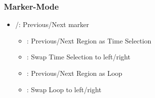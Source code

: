 \subsubsection{Marker-Mode}
\begin{itemize}
\item \rewind/\forward: Previous/Next marker
\bemod
\begin{itemize}
        \item \option: Previous/Next Region as Time Selection
        \item \shift \option: Swap Time Selection to left/right
        \item \alt: Previous/Next Region as Loop
        \item \control \alt:  Swap Loop to left/right
\end{itemize}
\end{itemize}

